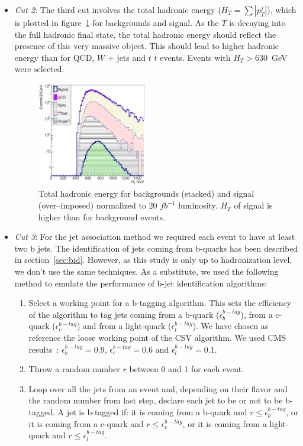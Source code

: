 \begin{itemize}
\item \textit{Cut 2}: The third cut involves the total hadronic energy ($H_{T}=\sum |p_{T}^{j}|$), which is plotted in figure~\ref{fig:Var2} for backgrounds and signal. As the $T$ is decaying into the full hadronic final state, the total hadronic energy should reflect the presence of this very massive object. This should lead to higher hadronic energy than for QCD, $W$ + jets and $t$ $\bar{t}$ events. Events with $H_{T}>630$~GeV were selected.

\begin{figure}[!Hhtbp]
  \begin{center}
    \includegraphics[width=0.45\textwidth]{figs/Pheno/HT.png}
    \caption{Total hadronic energy for backgrounds (stacked) and signal (over--imposed) normalized to 20 $fb^{-1}$ luminosity. $H_{T}$ of signal is higher than for background events.}
    \label{fig:Var2}
  \end{center}
\end{figure}

\item \textit{Cut 3}: For the jet association method we required each event to have at least two b jets. The identification of jets coming from b-quarks has been described in section~\ref{sec:bid}. However, as this study is only up to hadronization level, we don't use the same techniques. As a substitute, we used the following method to emulate the performance of b-jet identification algorithms:
  \begin{enumerate}
  \item Select a working point for a b-tagging algorithm. This sets the efficiency of the algorithm to tag jets coming from a b-quark ($\epsilon^{b-tag}_{b}$), from a c-quark ($\epsilon^{b-tag}_{c}$) and from a light-quark ($\epsilon^{b-tag}_{l}$). We have chosen as reference the loose working point of the CSV algorithm. We used CMS results~\cite{CMS-PAS-BTV-13-001}: $\epsilon^{b-tag}_{b}=0.9$, $\epsilon^{b-tag}_{c}=0.6$ and $\epsilon^{b-tag}_{l}=0.1$. 
  \item Throw a random number $r$ between 0 and 1 for each event.
  \item Loop over all the jets from an event and, depending on their flavor and the random number from last step, declare each jet to be or not to be b-tagged. A jet is b-tagged if: it is coming from a b-quark and $r\leq\epsilon^{b-tag}_{b}$, or it is coming from a c-quark and $r\leq\epsilon^{b-tag}_{c}$, or it is coming from a light-quark and $r\leq\epsilon^{b-tag}_{l}$.
  \end{enumerate}


\end{itemize}
